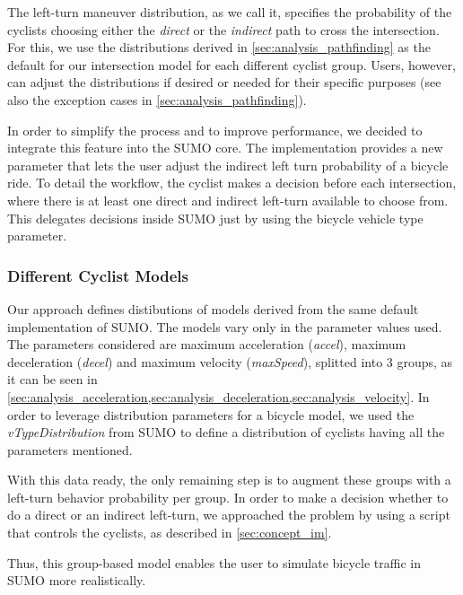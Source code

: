 The left-turn maneuver distribution, as we call it, specifies the probability of the cyclists choosing either the \textit{direct} or the \textit{indirect} path to cross the intersection.
For this, we use the distributions derived in \cref{sec:analysis_pathfinding} as the default for our intersection model for each different cyclist group.
Users, however, can adjust the distributions if desired or needed for their specific purposes (see also the exception cases in \cref{sec:analysis_pathfinding}).

In order to simplify the process and to improve performance, we decided to integrate this feature into the SUMO core.
The implementation provides a new parameter that lets the user adjust the indirect left turn probability of a bicycle ride.
To detail the workflow, the cyclist makes a decision before each intersection, where there is at least one direct and indirect left-turn available to choose from.
This delegates decisions inside SUMO just by using the bicycle vehicle type parameter.

\subsubsection{Different Cyclist Models}
\label{subsubsec:different_cyclist_models}

Our approach defines distibutions of models derived from the same default implementation of SUMO.
The models vary only in the parameter values used.
The parameters considered are maximum acceleration (\textit{accel}), maximum deceleration (\textit{decel}) and maximum velocity (\textit{maxSpeed}), splitted into \num{3} groups, as it can be seen in \cref{sec:analysis_acceleration,sec:analysis_deceleration,sec:analysis_velocity}.
In order to leverage distribution parameters for a bicycle model, we used the \textit{vTypeDistribution} from SUMO to define a distribution of cyclists having all the parameters mentioned.

With this data ready, the only remaining step is to augment these groups with a left-turn behavior probability per group.
In order to make a decision whether to do a direct or an indirect left-turn, we approached the problem by using a script that controls the cyclists, as described in \cref{sec:concept_im}.

Thus, this group-based model enables the user to simulate bicycle traffic in SUMO more realistically.

